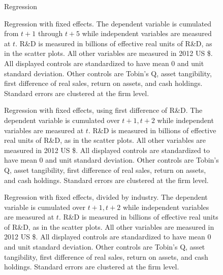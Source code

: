 \documentclass[11pt,english]{article}
\theoremstyle{remark}
\begin{document}
\begin{figure}[p]
	\centering
	
	\caption{Regression}
	\label{regs_allSpinouts_fd_nofe}
\end{figure}

\begin{figure}[p]
	\centering
	
	\caption{Regression with fixed effects. The dependent variable is cumulated from $t+1$ through $t+5$ while independent variables are measured at $t$. R\&D is measured in billions of effective real units of R\&D, as in the scatter plots. All other variables are measured in 2012 US \$. All displayed controls are standardized to have mean 0 and unit standard deviation. Other controls are Tobin's Q, asset tangibility, first difference of real sales, return on assets, and cash holdings. Standard errors are clustered at the firm level.}
	\label{regs_allSpinouts_FE}
\end{figure}

\begin{figure}[p]
	\centering
	
	\caption{Regression with fixed effects, using first difference of R\&D. The dependent variable is cumulated over $t+1,t+2$ while independent variables are measured at $t$. R\&D is measured in billions of effective real units of R\&D, as in the scatter plots. All other variables are measured in 2012 US \$. All displayed controls are standardized to have mean 0 and unit standard deviation. Other controls are Tobin's Q, asset tangibility, first difference of real sales, return on assets, and cash holdings. Standard errors are clustered at the firm level.}
	\label{regs_allSpinouts_fd_FE}
\end{figure}

\begin{figure}[p]
	\centering
	
	\caption{Regression with fixed effects, divided by industry. The dependent variable is cumulated over $t+1,t+2$ while independent variables are measured at $t$. R\&D is measured in billions of effective real units of R\&D, as in the scatter plots. All other variables are measured in 2012 US \$. All displayed controls are standardized to have mean 0 and unit standard deviation. Other controls are Tobin's Q, asset tangibility, first difference of real sales, return on assets, and cash holdings. Standard errors are clustered at the firm level.}
	\label{regs_spinouts_wso_fe}
\end{figure}
\end{document}
